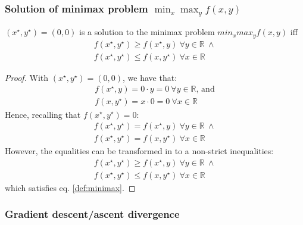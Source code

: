 \documentclass[12pt]{article}
\begin{document}
\subsubsection{Solution of minimax problem \texorpdfstring{$\min_{x} \max_{y} f(x, y)$}{Lg}}

$ (x^{\star},y^{\star})=(0,0)$ is a solution to the minimax problem $min_x max_y f(x,y)$ iff
\begin{equation}
\begin{gathered} \label{def:minimax}
    f(x^{\star},y^{\star}) \geq f(x^{\star},y) \ \forall y \in \mathbb{R} \ \land
    \\ f(x^{\star},y^{\star}) \leq f(x,y^{\star}) \ \forall x \in \mathbb{R}
\end{gathered}
\end{equation}
\begin{proof}
With $(x^{\star}, y^{\star}) = (0, 0)$, we have that:
\begin{equation}
\begin{gathered}
    f(x^{\star}, y) = 0 \cdot y = 0 \ \forall y \in \mathbb{R} \text{, and} \\
    f(x, y^{\star}) = x \cdot 0 = 0 \ \forall x \in \mathbb{R}
\end{gathered}
\end{equation}
Hence, recalling that $f(x^{\star}, y^{\star}) = 0$:
\begin{equation}
\begin{gathered}
    f(x^{\star}, y^{\star}) = f(x^{\star}, y)  \ \forall y \in \mathbb{R} \ \land \\
    f(x^{\star}, y^{\star}) = f(x, y^{\star})  \ \forall x \in \mathbb{R}
\end{gathered}
\end{equation}
However, the equalities can be transformed in to a non-strict inequalities:
\begin{equation}
\begin{gathered}
    f(x^{\star}, y^{\star}) \geq f(x^{\star}, y)  \ \forall y \in \mathbb{R} \ \land \\
    f(x^{\star}, y^{\star}) \leq f(x, y^{\star})  \ \forall x \in \mathbb{R}
\end{gathered}
\end{equation}
which satisfies eq. \eqref{def:minimax}.

\end{proof}

\subsubsection{Gradient descent/ascent divergence} \label{subsub:grad-divergence}
\end{document}
